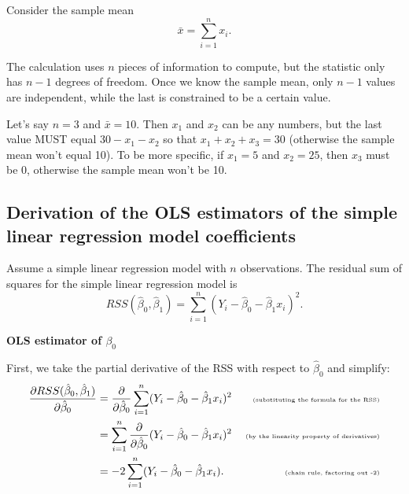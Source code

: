 \documentclass[
]{book}
\theoremstyle{definition}
\theoremstyle{definition}
\theoremstyle{definition}
\theoremstyle{definition}
\theoremstyle{remark}
\begin{document}
Consider the sample mean
\[\bar{x}=\sum_{i=1}^n x_i.\]

The calculation uses \(n\) pieces of information to compute, but the statistic only has \(n-1\) degrees of freedom. Once we know the sample mean, only \(n-1\) values are independent, while the last is constrained to be a certain value.

Let's say \(n=3\) and \(\bar{x} = 10\). Then \(x_1\) and \(x_2\) can be any numbers, but the last value MUST equal \(30 - x_1 - x_2\) so that \(x_1 + x_2 + x_3 = 30\) (otherwise the sample mean won't equal 10). To be more specific, if \(x_1 = 5\) and \(x_2 = 25\), then \(x_3\) must be 0, otherwise the sample mean won't be 10.

\hypertarget{slr-derivation}{%
\subsection{Derivation of the OLS estimators of the simple linear regression model coefficients}\label{slr-derivation}}

Assume a simple linear regression model with \(n\) observations. The residual sum of squares for the simple linear regression model is
\[
RSS(\hat\beta_0, \hat\beta_1) = \sum_{i=1}^n(Y_i - \hat\beta_0 - \hat\beta_1x_i)^2.
\]

\textbf{OLS estimator of \(\beta_0\)}

First, we take the partial derivative of the RSS with respect to \(\hat\beta_0\) and simplify:
\[
\begin{aligned}
\frac{\partial RSS(\hat\beta_0, \hat\beta_1)}{\partial \hat\beta_0} &= \frac{\partial}{\partial \hat\beta_0}\sum_{i=1}^n(Y_i - \hat\beta_0 - \hat\beta_1x_i)^2 & \tiny\text{ (substituting the formula for the RSS)} \\
&= \sum_{i=1}^n \frac{\partial}{\partial \hat\beta_0}(Y_i - \hat\beta_0 - \hat\beta_1x_i)^2  & \tiny\text{ (by the linearity property of derivatives)} \\
&= -2\sum_{i=1}^n(Y_i - \hat\beta_0 - \hat\beta_1x_i). & \tiny\text{ (chain rule, factoring out -2)}
\end{aligned}
\]
\end{document}
